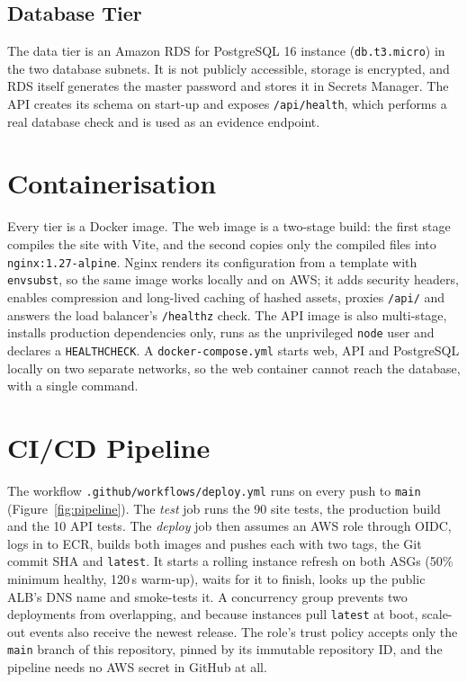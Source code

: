 \documentclass[10pt,a4paper]{article}
\begin{document}
\subsection{Database Tier}
The data tier is an Amazon RDS for PostgreSQL 16 instance (\texttt{db.t3.micro}) in the two database subnets. It is not publicly
accessible, storage is encrypted, and RDS itself generates the master password and stores it in Secrets Manager. The API creates its
schema on start-up and exposes \texttt{/api/health}, which performs a real database check and is used as an evidence endpoint.

\section{Containerisation}
Every tier is a Docker image. The web image is a two-stage build: the first stage compiles the site with Vite, and the second copies only the
compiled files into \texttt{nginx:1.27-alpine}. Nginx renders its configuration from a template with \texttt{envsubst}, so the same image
works locally and on AWS; it adds security headers, enables compression and long-lived caching of hashed assets, proxies \texttt{/api/}
and answers the load balancer's \texttt{/healthz} check. The API image is also multi-stage, installs production dependencies only,
runs as the unprivileged \texttt{node} user and declares a \texttt{HEALTHCHECK}. A \texttt{docker-compose.yml} starts web, API and PostgreSQL
locally on two separate networks, so the web container cannot reach the database, with a single command.

\section{CI/CD Pipeline}
The workflow \texttt{.github/workflows/deploy.yml} runs on every push to \texttt{main} (Figure~\ref{fig:pipeline}). The \emph{test} job runs
the 90 site tests, the production build and the 10 API tests. The \emph{deploy} job then assumes an AWS role through OIDC, logs in to ECR,
builds both images and pushes each with two tags, the Git commit SHA and \texttt{latest}. It starts a rolling instance refresh on both ASGs
(50\% minimum healthy, 120\,s warm-up), waits for it to finish, looks up the public ALB's DNS name and smoke-tests it. A concurrency group
prevents two deployments from overlapping, and because instances pull \texttt{latest} at boot, scale-out events also receive the newest release.
The role's trust policy accepts only the \texttt{main} branch of this repository, pinned by its immutable repository ID, and the pipeline
needs no AWS secret in GitHub at all.
\end{document}
